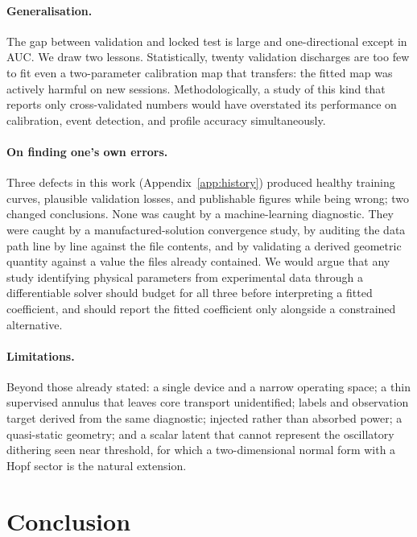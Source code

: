 \documentclass[11pt]{article}
\begin{document}
\paragraph{Generalisation.} The gap between validation and locked test is
large and one-directional except in AUC. We draw two lessons. Statistically,
twenty validation discharges are too few to fit even a two-parameter
calibration map that transfers: the fitted map was actively harmful on new
sessions. Methodologically, a study of this kind that reports only
cross-validated numbers would have overstated its performance on
calibration, event detection, and profile accuracy simultaneously.

\paragraph{On finding one's own errors.} Three defects in this work
(Appendix~\ref{app:history}) produced healthy training curves, plausible
validation losses, and publishable figures while being wrong; two changed
conclusions. None was caught by a machine-learning diagnostic. They were
caught by a manufactured-solution convergence study, by auditing the data
path line by line against the file contents, and by validating a derived
geometric quantity against a value the files already contained. We would
argue that any study identifying physical parameters from experimental data
through a differentiable solver should budget for all three before
interpreting a fitted coefficient, and should report the fitted coefficient
only alongside a constrained alternative.

\paragraph{Limitations.} Beyond those already stated: a single device and a
narrow operating space; a thin supervised annulus that leaves core transport
unidentified; labels and observation target derived from the same
diagnostic; injected rather than absorbed power; a quasi-static geometry;
and a scalar latent that cannot represent the oscillatory dithering seen
near threshold, for which a two-dimensional normal form with a Hopf sector
is the natural extension.

\section{Conclusion}
\label{sec:conclusion}
\end{document}
